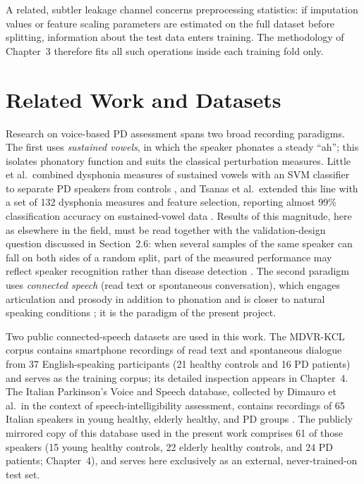 A related, subtler leakage channel concerns preprocessing statistics:
if imputation values or feature scaling parameters are estimated on the
full dataset before splitting, information about the test data enters
training. The methodology of Chapter~3 therefore fits all such
operations inside each training fold only.

\section{Related Work and Datasets}

Research on voice-based PD assessment spans two broad recording
paradigms. The first uses \emph{sustained vowels}, in which the speaker
phonates a steady ``ah''; this isolates phonatory function and suits
the classical perturbation measures. Little et al.\ combined dysphonia
measures of sustained vowels with an SVM classifier to separate PD
speakers from controls \cite{little2009}, and Tsanas et al.\ extended
this line with a set of 132 dysphonia measures and feature selection,
reporting almost 99\% classification accuracy on sustained-vowel data
\cite{tsanas2012}. Results of this magnitude, here as elsewhere in the
field, must be read together with the validation-design question
discussed in Section~2.6: when several samples of the same speaker can
fall on both sides of a random split, part of the measured performance
may reflect speaker recognition rather than disease detection
\cite{saeb2017}. The second paradigm uses \emph{connected
speech} (read text or spontaneous conversation), which engages
articulation and prosody in addition to phonation and is closer to
natural speaking conditions \cite{rusz2011,skodda2008}; it is the
paradigm of the present project.

Two public connected-speech datasets are used in this work. The
MDVR-KCL corpus \cite{jaeger2019} contains smartphone recordings of
read text and spontaneous dialogue from 37 English-speaking
participants (21 healthy controls and 16 PD patients) and serves as the
training corpus; its detailed inspection appears in Chapter~4. The
Italian Parkinson's Voice and Speech database, collected by Dimauro et
al.\ in the context of speech-intelligibility assessment, contains
recordings of 65 Italian speakers in young healthy, elderly healthy,
and PD groups \cite{dimauro2017}. The publicly mirrored copy of this
database used in the present work comprises 61 of those speakers
(15 young healthy controls, 22 elderly healthy controls, and 24 PD
patients; Chapter~4), and serves here exclusively as an external,
never-trained-on test set.

